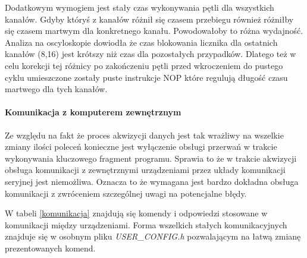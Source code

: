 Dodatkowym wymogiem jest stały czas wykonywania pętli dla wszystkich kanałów. Gdyby któryś z kanałów różnił się czasem przebiegu również różniłby się czasem martwym dla konkretnego kanału. Powodowałoby to różna wydajność. 
Analiza na oscyloskopie dowiodła że czas blokowania licznika dla ostatnich kanałów (8,16) jest krótszy niż czas dla pozostałych przypadków. Dlatego też w celu korekcji tej różnicy po zakończeniu pętli przed wkroczeniem do pustego cyklu umieszczone zostały puste instrukcje NOP które regulują długość czasu martwego dla tych kanałów. 


\paragraph{Komunikacja z komputerem zewnętrznym}
Ze względu na fakt że proces akwizycji danych jest tak wrażliwy na wszelkie zmiany ilości poleceń konieczne jest wyłączenie obsługi przerwań w trakcie wykonywania kluczowego fragment programu. 
Sprawia to że w trakcie akwizycji obsługa komunikacji z zewnętrznymi urządzeniami przez układy komunikacji seryjnej jest niemożliwa. 
Oznacza to że wymagana jest bardzo dokładna obsługa komunikacji z zwróceniem szczególnej uwagi na potencjalne błędy. 

W tabeli \ref{komunikacja} znajdują się komendy i odpowiedzi stosowane w komunikacji między urządzeniami. 
Forma wszelkich stałych komunikacyjnych znajduje się w osobnym pliku \textit{USER\_CONFIG.h} pozwalającym na łatwą zmianę prezentowanych komend.


